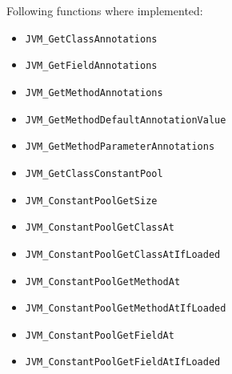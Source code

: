 \documentclass[a4paper, 10pt, titlepage]{scrartcl} %
\begin{document}
Following functions where implemented:
\begin{itemize}
 \item \begin{scriptsize}\verb|JVM_GetClassAnnotations|\end{scriptsize}
 \item \begin{scriptsize}\verb|JVM_GetFieldAnnotations|\end{scriptsize}
 \item \begin{scriptsize}\verb|JVM_GetMethodAnnotations|\end{scriptsize}
 \item \begin{scriptsize}\verb|JVM_GetMethodDefaultAnnotationValue|\end{scriptsize}
 \item \begin{scriptsize}\verb|JVM_GetMethodParameterAnnotations|\end{scriptsize}
 \item \begin{scriptsize}\verb|JVM_GetClassConstantPool|\end{scriptsize}
 \item \begin{scriptsize}\verb|JVM_ConstantPoolGetSize|\end{scriptsize}
 \item \begin{scriptsize}\verb|JVM_ConstantPoolGetClassAt|\end{scriptsize}
 \item \begin{scriptsize}\verb|JVM_ConstantPoolGetClassAtIfLoaded|\end{scriptsize}
 \item \begin{scriptsize}\verb|JVM_ConstantPoolGetMethodAt|\end{scriptsize}
 \item \begin{scriptsize}\verb|JVM_ConstantPoolGetMethodAtIfLoaded|\end{scriptsize}
 \item \begin{scriptsize}\verb|JVM_ConstantPoolGetFieldAt|\end{scriptsize}
 \item \begin{scriptsize}\verb|JVM_ConstantPoolGetFieldAtIfLoaded|\end{scriptsize}

\end{itemize}
\end{document}
